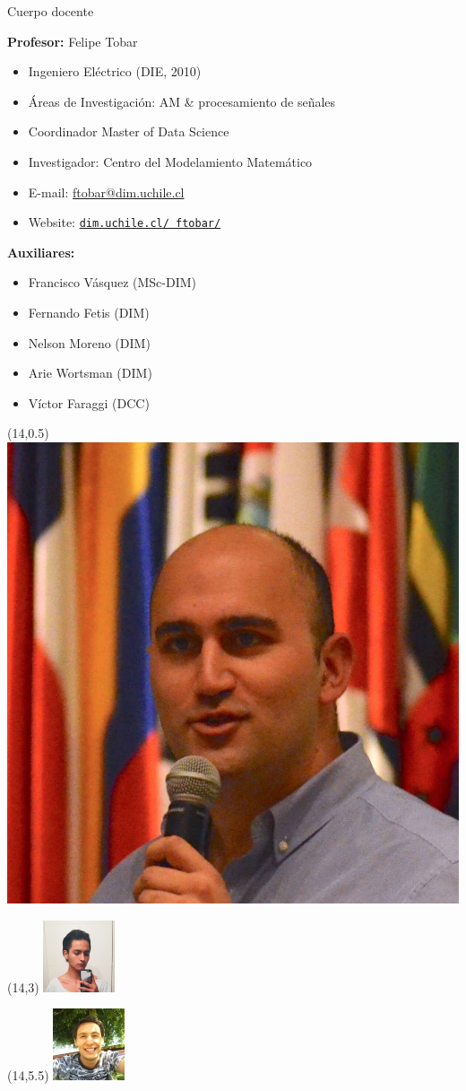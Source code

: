 \documentclass[9pt]{beamer}
\begin{document}
\begin{frame}{Cuerpo docente}

\textbf{Profesor:} Felipe Tobar
\begin{itemize}
  \item Ingeniero Eléctrico (DIE, 2010) 
  \item Áreas de Investigación: AM \& procesamiento de señales
  \item Coordinador Master of Data Science 
  \item Investigador: Centro del Modelamiento Matemático 
  \item E-mail: \url{ftobar@dim.uchile.cl}
  \item Website: \href{http://www.dim.uchile.cl/~ftobar/}{\tt dim.uchile.cl/~ftobar/} 
\end{itemize}

\vfill
\textbf{Auxiliares:}
\begin{itemize}
  \item Francisco Vásquez (MSc-DIM)
  \item Fernando Fetis (DIM) 
  \item Nelson Moreno  (DIM) 
  \item Arie Wortsman (DIM) 
  \item Víctor Faraggi (DCC) 
\end{itemize}
\vfill
  \begin{textblock}{7}(14,0.5)
    \includegraphics[height=.25\textwidth]{../img/cap0_felipe.pdf}
  \end{textblock}
  \begin{textblock}{7}(14,3)
    \includegraphics[height=.25\textwidth]{../img/cap0_francisco.jpg}
  \end{textblock}
  \begin{textblock}{7}(14,5.5)
    \includegraphics[height=.25\textwidth]{../img/cap0_fernando.jpg}
  \end{textblock}


\end{frame}
\end{document}
